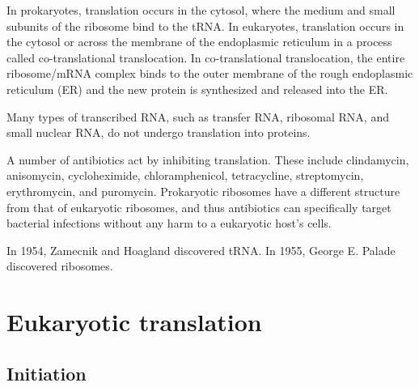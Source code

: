 In prokaryotes, translation occurs in the cytosol, where the medium and small subunits of the ribosome bind to the tRNA. In eukaryotes, translation occurs in the cytosol or across the membrane of the endoplasmic reticulum in a process called co-translational translocation. In co-translational translocation, the entire ribosome/mRNA complex binds to the outer membrane of the rough endoplasmic reticulum (ER) and the new protein is synthesized and released into the ER.

Many types of transcribed RNA, such as transfer RNA, ribosomal RNA, and small nuclear RNA, do not undergo translation into proteins.

A number of antibiotics act by inhibiting translation. These include clindamycin, anisomycin, cycloheximide, chloramphenicol, tetracycline, streptomycin, erythromycin, and puromycin. Prokaryotic ribosomes have a different structure from that of eukaryotic ribosomes, and thus antibiotics can specifically target bacterial infections without any harm to a eukaryotic host's cells.

In 1954, Zamecnik and Hoagland discovered tRNA. In 1955, George E. Palade discovered ribosomes.

\hypertarget{eukaryotic-translation}{%
\section{Eukaryotic translation}\label{eukaryotic-translation}}

\hypertarget{initiation-3}{%
\subsection{Initiation}\label{initiation-3}}

